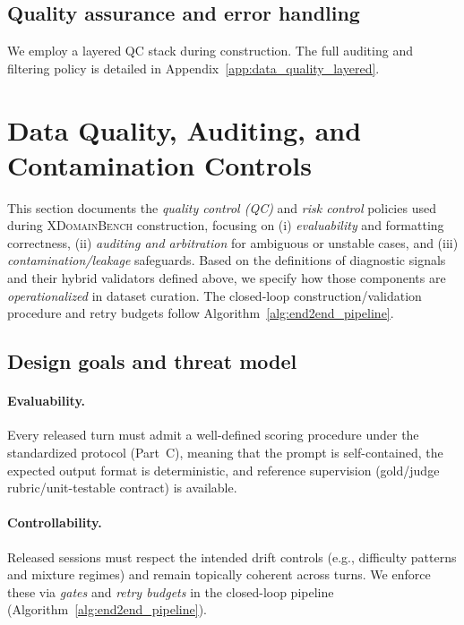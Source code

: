 \subsection{Quality assurance and error handling}
\label{app:construction_qc}

We employ a layered QC stack during construction. The full auditing and filtering policy is detailed in Appendix~\ref{app:data_quality_layered}.


\clearpage
{}
\section{Data Quality, Auditing, and Contamination Controls}
\label{app:data_quality}

This section documents the \emph{quality control (QC)} and \emph{risk control} policies used during \textsc{XDomainBench} construction, focusing on (i) \emph{evaluability} and formatting correctness, (ii) \emph{auditing and arbitration} for ambiguous or unstable cases, and (iii) \emph{contamination/leakage} safeguards.
Based on the definitions of diagnostic signals and their hybrid validators defined above, we specify how those components are \emph{operationalized} in dataset curation.
The closed-loop construction/validation procedure and retry budgets follow Algorithm~\ref{alg:end2end_pipeline}.

\subsection{Design goals and threat model}
\label{app:data_quality_goals}

\paragraph{Evaluability.}
Every released turn must admit a well-defined scoring procedure under the standardized protocol (Part~C), meaning that the prompt is self-contained, the expected output format is deterministic, and reference supervision (gold/judge rubric/unit-testable contract) is available.

\paragraph{Controllability.}
Released sessions must respect the intended drift controls (e.g., difficulty patterns and mixture regimes) and remain topically coherent across turns. We enforce these via \emph{gates} and \emph{retry budgets} in the closed-loop pipeline (Algorithm~\ref{alg:end2end_pipeline}).

